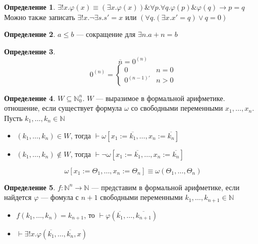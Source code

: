 \documentclass[english]{article}
\newcommand{\N}{\mathbb{N}}
\theoremstyle{plain}
\theoremstyle{remark}
\theoremstyle{definition}
\newtheorem*{definition}{Определение}
\begin{document}
\begin{definition}
\(\exists! x.\varphi(x) \equiv (\exists x. \varphi(x))\&\forall p.\forall q. \varphi(p)\&\varphi(q) \to p = q\) \\
Можно также записать \(\exists ! x.\neg \exists s. s' = x\) или \((\forall q.(\exists x. x' = q)\vee q= 0)\)
\end{definition}
\begin{definition}
\(a \le b\) --- сокращение для \(\exists n. a + n = b\)
\end{definition}
\begin{definition}
\[ \overline{n} = 0^{(n)}\]
\[ 0^{(n)} = \begin{cases}
0 & n = 0 \\
0^{(n - 1)'} & n > 0
\end{cases}\]
\end{definition}
\begin{definition}
\(W \subseteq \N_0^n\). \(W\) --- выразимое в формальной арифметике. отношение, если существует формула \(\omega\) со свободными переменными \(x_1,\dots,x_n\). Пусть \(k_1,\dots,k_n \in \N\)
\begin{itemize}
\item \((k_1,\dots,k_n) \in W\), тогда \(\vdash \omega[x_1:=\overline{k_1}, \dots, x_n := \overline{k_n}]\)
\item \((k_1,\dots,k_n) \not\in W\), тогда \(\vdash \neg \omega[x_1:=\overline{k_1},\dots,x_n:=\overline{k_n}]\)
\end{itemize}
\[ \omega[x_1:=\Theta_1,\dots,x_n:=\Theta_n] \equiv \omega(\Theta_1, \dots, \Theta_n) \]
\end{definition}
\begin{definition}
\(f: \N^n \to \N\) --- представим в формальной арифметике, если найдется \(\varphi\) --- фомула с \(n + 1\) свободными переменными \(k_1, \dots, k_{n + 1} \in \N\)
\begin{itemize}
\item \(f(k_1,\dots,k_n) = k_{n + 1}\), то \(\vdash \varphi(\overline{k_1},\dots,\overline{k_{n + 1}})\) \\
\item \(\vdash \exists! x.\varphi(\overline{k_1},\dots,\overline{k_n},x)\)
\end{itemize}
\end{definition}
\end{document}
